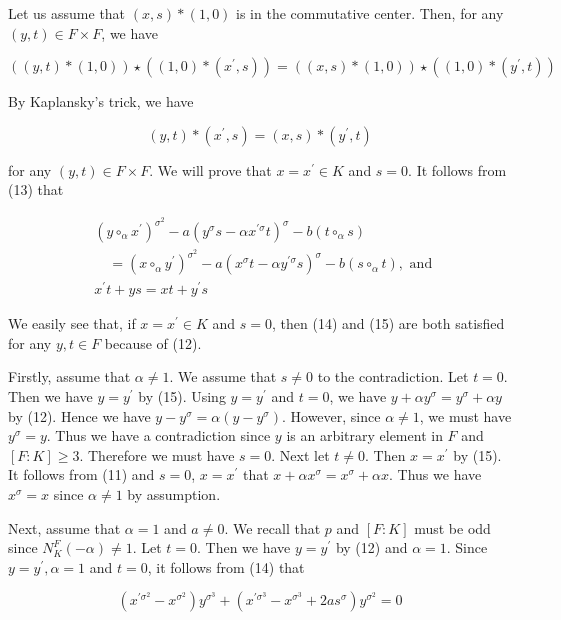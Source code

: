 \documentclass[10pt]{article}
\begin{document}
Let us assume that $(x, s) *(1,0)$ is in the commutative center. Then, for any $(y, t) \in F \times F$, we have

$$
((y, t) *(1,0)) \star\left((1,0) *\left(x^{\prime}, s\right)\right)=((x, s) *(1,0)) \star\left((1,0) *\left(y^{\prime}, t\right)\right)
$$

By Kaplansky's trick, we have


\begin{equation*}
(y, t) *\left(x^{\prime}, s\right)=(x, s) *\left(y^{\prime}, t\right) \tag{13}
\end{equation*}


for any $(y, t) \in F \times F$. We will prove that $x=x^{\prime} \in K$ and $s=0$. It follows from (13) that


\begin{align*}
& \left(y \circ_{\alpha} x^{\prime}\right)^{\sigma^{2}}-a\left(y^{\sigma} s-\alpha x^{\prime \sigma} t\right)^{\sigma}-b\left(t \circ_{\alpha} s\right) \\
& \quad=\left(x \circ_{\alpha} y^{\prime}\right)^{\sigma^{2}}-a\left(x^{\sigma} t-\alpha y^{\prime \sigma} s\right)^{\sigma}-b\left(s \circ_{\alpha} t\right), \text { and }  \tag{14}\\
& x^{\prime} t+y s=x t+y^{\prime} s \tag{15}
\end{align*}


We easily see that, if $x=x^{\prime} \in K$ and $s=0$, then (14) and (15) are both satisfied for any $y, t \in F$ because of (12).

Firstly, assume that $\alpha \neq 1$. We assume that $s \neq 0$ to the contradiction. Let $t=0$. Then we have $y=y^{\prime}$ by (15). Using $y=y^{\prime}$ and $t=0$, we have $y+\alpha y^{\sigma}=y^{\sigma}+\alpha y$ by (12). Hence we have $y-y^{\sigma}=\alpha\left(y-y^{\sigma}\right)$. However, since $\alpha \neq 1$, we must have $y^{\sigma}=y$. Thus we have a contradiction since $y$ is an arbitrary element in $F$ and $[F: K] \geq 3$. Therefore we must have $s=0$. Next let $t \neq 0$. Then $x=x^{\prime}$ by (15). It follows from (11) and $s=0$, $x=x^{\prime}$ that $x+\alpha x^{\sigma}=x^{\sigma}+\alpha x$. Thus we have $x^{\sigma}=x$ since $\alpha \neq 1$ by assumption.

Next, assume that $\alpha=1$ and $a \neq 0$. We recall that $p$ and $[F: K]$ must be odd since $N_{K}^{F}(-\alpha) \neq 1$. Let $t=0$. Then we have $y=y^{\prime}$ by (12) and $\alpha=1$. Since $y=y^{\prime}, \alpha=1$ and $t=0$, it follows from (14) that

$$
\left(x^{\prime \sigma^{2}}-x^{\sigma^{2}}\right) y^{\sigma^{3}}+\left(x^{\prime \sigma^{3}}-x^{\sigma^{3}}+2 a s^{\sigma}\right) y^{\sigma^{2}}=0
$$
\end{document}
